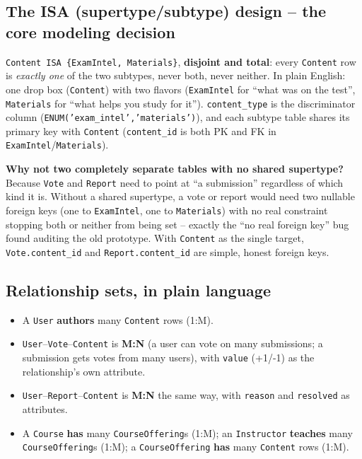 \documentclass[11pt]{article}
\newenvironment{tightlist}{\begin{itemize}[leftmargin=1.4em,itemsep=2pt,topsep=2pt]}{\end{itemize}}
\begin{document}
\subsection{The ISA (supertype/subtype) design -- the core modeling decision}
\texttt{Content ISA \{ExamIntel, Materials\}}, \textbf{disjoint and total}: every \texttt{Content} row is \emph{exactly one} of the two subtypes, never both, never neither. In plain English: one drop box (\texttt{Content}) with two flavors (\texttt{ExamIntel} for ``what was on the test'', \texttt{Materials} for ``what helps you study for it''). \texttt{content\_type} is the discriminator column (\texttt{ENUM('exam\_intel','materials')}), and each subtype table shares its primary key with \texttt{Content} (\texttt{content\_id} is both PK and FK in \texttt{ExamIntel}/\texttt{Materials}).

\textbf{Why not two completely separate tables with no shared supertype?} Because \texttt{Vote} and \texttt{Report} need to point at ``a submission'' regardless of which kind it is. Without a shared supertype, a vote or report would need two nullable foreign keys (one to \texttt{ExamIntel}, one to \texttt{Materials}) with no real constraint stopping both or neither from being set -- exactly the ``no real foreign key'' bug found auditing the old prototype. With \texttt{Content} as the single target, \texttt{Vote.content\_id} and \texttt{Report.content\_id} are simple, honest foreign keys.

\subsection{Relationship sets, in plain language}
\begin{tightlist}
  \item A \texttt{User} \textbf{authors} many \texttt{Content} rows (1:M).
  \item \texttt{User}--\texttt{Vote}--\texttt{Content} is \textbf{M:N} (a user can vote on many submissions; a submission gets votes from many users), with \texttt{value} (+1/-1) as the relationship's own attribute.
  \item \texttt{User}--\texttt{Report}--\texttt{Content} is \textbf{M:N} the same way, with \texttt{reason} and \texttt{resolved} as attributes.
  \item A \texttt{Course} \textbf{has} many \texttt{CourseOffering}s (1:M); an \texttt{Instructor} \textbf{teaches} many \texttt{CourseOffering}s (1:M); a \texttt{CourseOffering} \textbf{has} many \texttt{Content} rows (1:M).
\end{tightlist}
\end{document}
